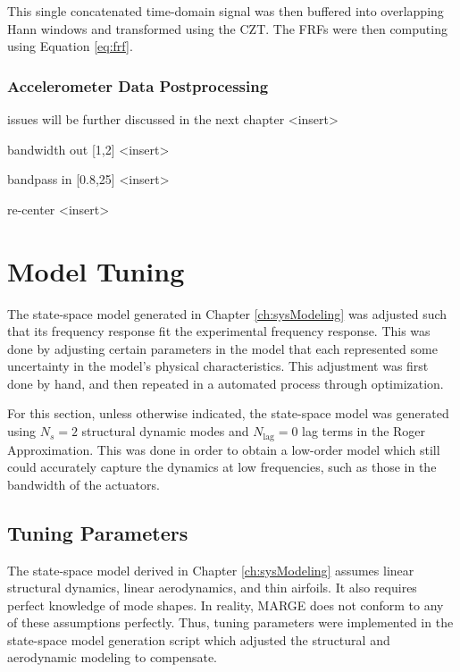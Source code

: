 This single concatenated time-domain signal was then buffered into overlapping Hann windows and transformed using the CZT. The FRFs were then computing using Equation \ref{eq:frf}.

\subsubsection{Accelerometer Data Postprocessing}

issues will be further discussed in the next chapter <insert>

bandwidth out [1,2] <insert>

bandpass in [0.8,25] <insert>

re-center <insert>


\section{Model Tuning} %

The state-space model generated in Chapter \ref{ch:sysModeling} was adjusted such that its frequency response fit the experimental frequency response. This was done by adjusting certain parameters in the model that each represented some uncertainty in the model's physical characteristics. This adjustment was first done by hand, and then repeated in a automated process through optimization.

For this section, unless otherwise indicated, the state-space model was generated using $N_s=2$ structural dynamic modes and $N_\text{lag}=0$ lag terms in the Roger Approximation. This was done in order to obtain a low-order model which still could accurately capture the dynamics at low frequencies, such as those in the bandwidth of the actuators.

\subsection{Tuning Parameters} %

The state-space model derived in Chapter \ref{ch:sysModeling} assumes linear structural dynamics, linear aerodynamics, and thin airfoils. It also requires perfect knowledge of mode shapes. In reality, MARGE does not conform to any of these assumptions perfectly. Thus, tuning parameters were implemented in the state-space model generation script which adjusted the structural and aerodynamic modeling to compensate.

